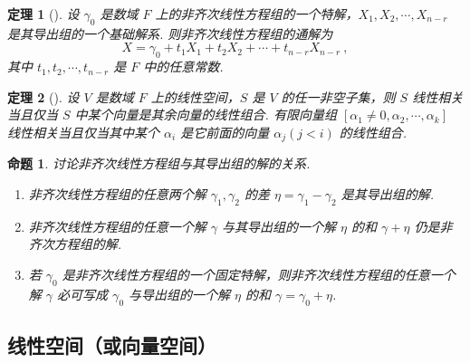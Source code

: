 \documentclass[zihao=-4,UTF8,linespread=1.8,nothm]{aytony_base}
\newtheorem{theorem}{\indent 定理}[subsection]
\newtheorem{proposition}{\indent 命题}[subsection]
\begin{document}
\begin{theorem}[]
    设 $\gamma_0$ 是数域 $F$ 上的非齐次线性方程组的一个特解，$X_1, X_2, \cdots, X_{n-r}$ 是其导出组的一个基础解系. 则非齐次线性方程组的通解为 $$
        X = \gamma_0 + t_1X_1 + t_2X_2 + \cdots + t_{n-r}X_{n-r}\ ,
    $$ 其中 $t_1, t_2, \cdots, t_{n-r}$ 是 $F$ 中的任意常数.
\end{theorem}

\begin{theorem}[]
    设 $V$ 是数域 $F$ 上的线性空间，$S$ 是 $V$ 的任一非空子集，则 $S$ 线性相关当且仅当 $S$ 中某个向量是其余向量的线性组合. 有限向量组 $[\alpha_1 \neq 0, \alpha_2, \cdots, \alpha_k]$ 线性相关当且仅当其中某个 $\alpha_i$ 是它前面的向量 $\alpha_j(j<i)$ 的线性组合.
\end{theorem}

\begin{proposition}
    讨论非齐次线性方程组与其导出组的解的关系.
    \begin{enumerate}[nosep]
        \item 非齐次线性方程组的任意两个解 $\gamma_1, \gamma_2$ 的差 $\eta = \gamma_1 - \gamma_2$ 是其导出组的解.
        \item 非齐次线性方程组的任意一个解 $\gamma$ 与其导出组的一个解 $\eta$ 的和 $\gamma + \eta$ 仍是非齐次方程组的解.
        \item 若 $\gamma_0$ 是非齐次线性方程组的一个固定特解，则非齐次线性方程组的任意一个解 $\gamma$ 必可写成 $\gamma_0$ 与导出组的一个解 $\eta$ 的和 $\gamma = \gamma_0 + \eta$.
    \end{enumerate}
\end{proposition}

\subsection{线性空间（或向量空间）}
\end{document}
